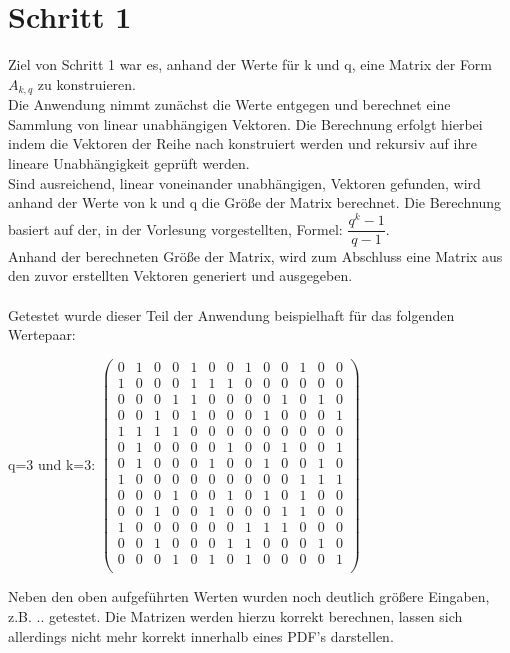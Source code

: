 \section{Schritt 1}
Ziel von Schritt 1 war es, anhand der Werte für k und q, eine Matrix der Form $A_{k,q}$ zu konstruieren. \\
Die Anwendung nimmt zunächst die Werte  entgegen und berechnet eine Sammlung von linear unabhängigen Vektoren. Die Berechnung erfolgt hierbei indem die Vektoren der Reihe nach konstruiert werden und rekursiv auf ihre lineare Unabhängigkeit geprüft werden.\\
Sind ausreichend, linear voneinander unabhängigen, Vektoren gefunden, wird anhand der Werte von k und q die Größe der Matrix berechnet. Die Berechnung basiert auf der, in der Vorlesung vorgestellten, Formel: $\dfrac{q^{k}-1}{q-1}$. \\
Anhand der berechneten Größe der Matrix, wird zum Abschluss eine Matrix aus den zuvor erstellten Vektoren generiert und ausgegeben.\\
\\
Getestet wurde dieser Teil der Anwendung beispielhaft für das folgenden Wertepaar:

\begin{description}
	\item
	q=3 und k=3:			
	$
	\begin{pmatrix}
		0 & 1 & 0 & 0 & 1 & 0 & 0 & 1 & 0 & 0 & 1 & 0 & 0 \\
		1 & 0 & 0 & 0 & 1 & 1 & 1 & 0 & 0 & 0 & 0 & 0 & 0 \\
		0 & 0 & 0 & 1 & 1 & 0 & 0 & 0 & 0 & 1 & 0 & 1 & 0 \\
		0 & 0 & 1 & 0 & 1 & 0 & 0 & 0 & 1 & 0 & 0 & 0 & 1 \\
		1 & 1 & 1 & 1 & 0 & 0 & 0 & 0 & 0 & 0 & 0 & 0 & 0 \\
		0 & 1 & 0 & 0 & 0 & 0 & 1 & 0 & 0 & 1 & 0 & 0 & 1 \\
		0 & 1 & 0 & 0 & 0 & 1 & 0 & 0 & 1 & 0 & 0 & 1 & 0 \\
		1 & 0 & 0 & 0 & 0 & 0 & 0 & 0 & 0 & 0 & 1 & 1 & 1 \\
		0 & 0 & 0 & 1 & 0 & 0 & 1 & 0 & 1 & 0 & 1 & 0 & 0 \\
		0 & 0 & 1 & 0 & 0 & 1 & 0 & 0 & 0 & 1 & 1 & 0 & 0 \\
		1 & 0 & 0 & 0 & 0 & 0 & 0 & 1 & 1 & 1 & 0 & 0 & 0 \\
		0 & 0 & 1 & 0 & 0 & 0 & 1 & 1 & 0 & 0 & 0 & 1 & 0 \\
		0 & 0 & 0 & 1 & 0 & 1 & 0 & 1 & 0 & 0 & 0 & 0 & 1 \\
	\end{pmatrix}
	$
\end{description}
Neben den oben aufgeführten Werten wurden noch deutlich größere Eingaben, z.B. .. getestet. Die Matrizen werden hierzu korrekt berechnen, lassen sich allerdings nicht mehr korrekt innerhalb eines PDF's darstellen.